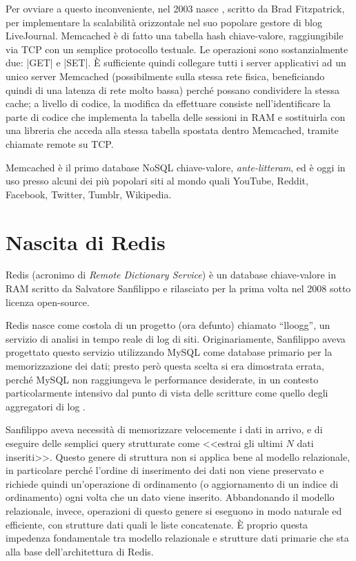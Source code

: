 Per ovviare a questo inconveniente, nel 2003 nasce ,
scritto da Brad Fitzpatrick, per implementare la scalabilità orizzontale nel suo popolare gestore di
blog LiveJournal. Memcached è di fatto una tabella hash chiave-valore, raggiungibile via TCP con un
semplice protocollo testuale. Le operazioni sono sostanzialmente due: \cverb|GET| e \cverb|SET|. È
sufficiente quindi collegare tutti i server applicativi ad un unico server Memcached (possibilmente
sulla stessa rete fisica, beneficiando quindi di una latenza di rete molto bassa) perché possano
condividere la stessa cache; a livello di codice, la modifica da effettuare consiste
nell'identificare la parte di codice che implementa la tabella delle sessioni in RAM e sostituirla
con una libreria che acceda alla stessa tabella spostata dentro Memcached, tramite chiamate remote
su TCP.

Memcached è il primo database NoSQL chiave-valore, \emph{ante-litteram}, ed è oggi in uso presso
alcuni dei più popolari siti al mondo quali YouTube, Reddit, Facebook, Twitter, Tumblr, Wikipedia.


\section{Nascita di Redis}

Redis (acronimo di \emph{Remote Dictionary Service}) è un database chiave-valore in RAM scritto
da Salvatore Sanfilippo e rilasciato per la prima volta nel 2008 sotto licenza open-source.

Redis nasce come costola di un progetto (ora defunto) chiamato ``lloogg'', un servizio di
analisi in tempo reale di log di siti. Originariamente, Sanfilippo aveva progettato
questo servizio utilizzando MySQL come database primario per la memorizzazione dei
dati; presto però questa scelta si era dimostrata errata, perché MySQL non raggiungeva le
performance desiderate, in un contesto particolarmente intensivo dal punto di vista delle
scritture come quello degli aggregatori di log \cite{nascita}.

Sanfilippo aveva necessità di memorizzare velocemente i dati in arrivo, e di eseguire
delle semplici query strutturate come <<estrai gli ultimi $N$ dati inseriti>>. Questo genere
di struttura non si applica bene al modello relazionale, in particolare perché l'ordine
di inserimento dei dati non viene preservato e richiede quindi un'operazione di ordinamento
(o aggiornamento di un indice di ordinamento) ogni volta che un dato viene inserito.
Abbandonando il modello relazionale, invece, operazioni di questo genere si eseguono
in modo naturale ed efficiente, con strutture dati quali le liste concatenate. È
proprio questa impedenza fondamentale tra modello relazionale e strutture dati primarie
che sta alla base dell'architettura di Redis.

